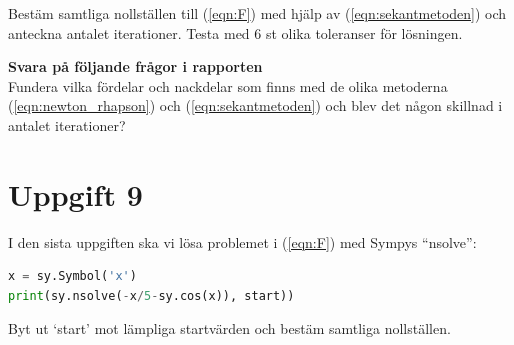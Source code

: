 \documentclass[a4paper]{article}
\begin{document}
Bestäm samtliga nollställen till (\ref{eqn:F}) med hjälp av
(\ref{eqn:sekantmetoden}) och anteckna antalet iterationer.
Testa med 6 st olika toleranser för lösningen.



\textbf{Svara på följande frågor i rapporten}\\
Fundera vilka fördelar och nackdelar som finns med de olika metoderna
(\ref{eqn:newton_rhapson}) och (\ref{eqn:sekantmetoden}) och blev det
någon skillnad i antalet iterationer?


\section{Uppgift 9}
I den sista uppgiften ska vi lösa problemet i (\ref{eqn:F}) med Sympys ``nsolve'':

\begin{lstlisting}[language=Python]
x = sy.Symbol('x')
print(sy.nsolve(-x/5-sy.cos(x)), start))
\end{lstlisting}

Byt ut `start' mot lämpliga startvärden och bestäm samtliga nollställen.
\end{document}
